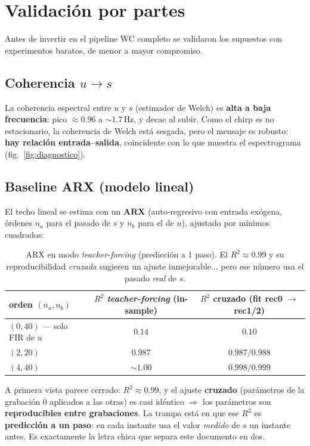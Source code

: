 \documentclass[11pt,a4paper]{article}
\begin{document}
\section{Validación por partes}
Antes de invertir en el pipeline WC completo se validaron los supuestos con experimentos baratos, de menor a mayor compromiso.

\subsection{Coherencia $u\to s$}
La coherencia espectral entre $u$ y $s$ (estimador de Welch) es \textbf{alta a baja frecuencia}: pico $\approx 0.96$ a $\sim$1.7\,Hz, y decae al subir. Como el chirp es no estacionario, la coherencia de Welch está sesgada, pero el mensaje es robusto: \textbf{hay relación entrada--salida}, coincidente con lo que muestra el espectrograma (fig.~\ref{fig:diagnostico}).

\subsection{Baseline ARX (modelo lineal)}
El techo lineal se estima con un \textbf{ARX} (auto-regresivo con entrada exógena, órdenes $n_a$ para el pasado de $s$ y $n_b$ para el de $u$), ajustado por mínimos cuadrados:

\begin{table}[H]
\centering
\small
\begin{tabular}{@{}lcc@{}}
\toprule
orden $(n_a, n_b)$ & $R^2$ \emph{teacher-forcing} (in-sample) & $R^2$ cruzado (fit rec0 $\to$ rec1/2) \\
\midrule
$(0, 40)$ --- solo FIR de $u$ & $0.14$ & $0.10$ \\
$(2, 20)$ & $\mathbf{0.987}$ & $\mathbf{0.987 / 0.988}$ \\
$(4, 40)$ & $\sim\!1.00$ & $0.998 / 0.999$ \\
\bottomrule
\end{tabular}
\caption{ARX en modo \emph{teacher-forcing} (predicción a 1 paso). El $R^2\approx0.99$ y su reproducibilidad \emph{cruzada} sugieren un ajuste inmejorable... pero ese número usa el pasado \emph{real} de $s$.}
\label{tab:arx}
\end{table}

A primera vista parece cerrado: $R^2\approx0.99$, y el ajuste \textbf{cruzado} (parámetros de la grabación 0 aplicados a las otras) es casi idéntico $\Rightarrow$ los parámetros son \textbf{reproducibles entre grabaciones}. La trampa está en que ese $R^2$ es \textbf{predicción a un paso}: en cada instante usa el valor \emph{medido} de $s$ un instante antes. Es exactamente la letra chica que separa este documento en dos.
\end{document}
